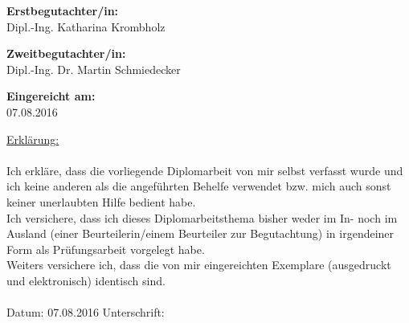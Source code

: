 \begin{center}
\hspace*{-1.0cm} \textbf{Erstbegutachter/in:} \\
\hspace*{-1.0cm} Dipl.-Ing. Katharina Krombholz \\

\vspace{0.5cm}

\hspace*{-1.0cm} \textbf{Zweitbegutachter/in:} \\
\hspace*{-1.0cm} Dipl.-Ing. Dr. Martin Schmiedecker \\


\vspace{1.4cm}

\hspace*{-1.0cm} \textbf{Eingereicht am:} \\
\hspace*{-1.0cm} 07.08.2016 \\

\end{center}

\newpage

\pagestyle{empty}

\vspace*{16.5cm}  %

\hspace*{-0.7cm} \underline{Erklärung:}\\\\
Ich erkläre, dass die vorliegende Diplomarbeit von mir selbst verfasst wurde und ich keine anderen als die angeführten Behelfe verwendet bzw. mich auch sonst keiner unerlaubten Hilfe bedient habe.\\
Ich versichere, dass ich dieses Diplomarbeitsthema bisher weder im In- noch im Ausland (einer Beurteilerin/einem Beurteiler zur Begutachtung) in irgendeiner Form als Prüfungsarbeit vorgelegt habe.\\
Weiters versichere ich, dass die von mir eingereichten Exemplare (ausgedruckt und elektronisch) identisch sind.\\\\
Datum: 07.08.2016 \hspace{6cm} Unterschrift:\\






